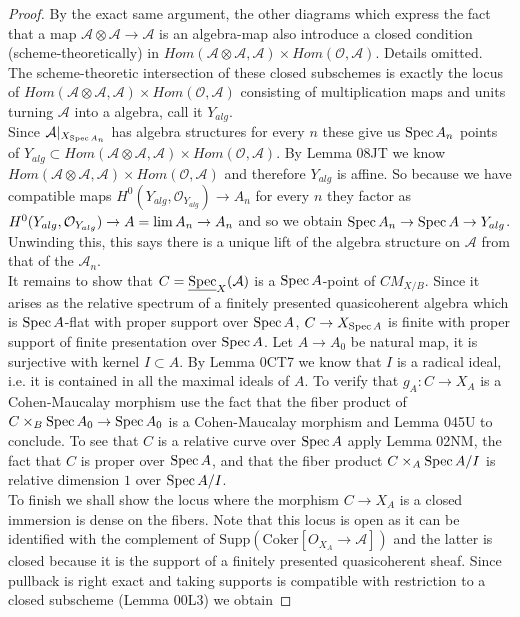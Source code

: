 \documentclass{stacks-project}
\theoremstyle{plain}
\theoremstyle{definition}
\DeclareMathOperator{\Spec}{Spec}
\theoremstyle{remark}
\numberwithin{equation}{subsection}
\def\lim{\mathop{\rm lim}\nolimits}
\def\Spec{\mathop{\rm Spec}}
\begin{document}
\begin{proof}
By the exact same argument, the other diagrams which express the fact that a map $\mathcal{A} \otimes \mathcal{A} \to \mathcal{A}$ is an algebra-map also introduce a closed condition (scheme-theoretically) in $Hom(\mathcal{A} \otimes \mathcal{A}, \mathcal{A}) \times Hom(\mathcal{O},\mathcal{A})$. Details omitted. 
\\

The scheme-theoretic intersection of these closed subschemes is exactly the locus of $Hom(\mathcal{A} \otimes \mathcal{A}, \mathcal{A}) \times Hom(\mathcal{O},\mathcal{A})$ consisting of multiplication maps and units turning $\mathcal{A}$ into a algebra, call it $Y_{alg}$. 
\\

Since $\mathcal{A}|_{X_{\Spec A_n}}$ has algebra structures for every $n$ these give us $\Spec A_n$ points of $Y_{alg} \subset Hom(\mathcal{A} \otimes \mathcal{A}, \mathcal{A}) \times Hom(\mathcal{O},\mathcal{A})$. By Lemma 08JT we know $Hom(\mathcal{A} \otimes \mathcal{A}, \mathcal{A}) \times Hom(\mathcal{O},\mathcal{A})$ and therefore $Y_{alg}$ is affine. So because we have compatible maps $H^0(Y_{alg},\mathcal{O}_{Y_{alg}}) \to A_n$ for every $n$ they factor as $H^0(Y_{alg},\mathcal{O}_{Y_{alg}}) \to A = \lim A_n \to  A_n$ and so we obtain $\Spec A_n \to \Spec A \to Y_{alg}$. Unwinding this, this says there is a unique lift of the algebra structure on $\mathcal{A}$ from that of the $\mathcal{A}_n$. 
\\

It remains to show that $C=\underline{\Spec}_X(\mathcal{A})$ is a $\Spec A$-point of $CM_{X/B}$. Since it arises as the relative spectrum of a finitely presented quasicoherent algebra which is $\Spec A$-flat with proper support over $\Spec A$, $C \to X_{\Spec A}$ is finite with proper support of finite presentation over $\Spec A$. Let $A \to A_0$ be natural map, it is surjective with kernel $I \subset A$. By Lemma 0CT7 we know that $I$ is a radical ideal, i.e. it is contained in all the maximal ideals of $A$. To verify that $g_A: C \to X_A$ is a Cohen-Maucalay morphism use the fact that the fiber product of $C \times_B \Spec A_0 \to \Spec A_0$ is a Cohen-Maucalay morphism and Lemma 045U to conclude. To see that $C$ is a relative curve over $\Spec A$ apply Lemma 02NM, the fact that $C$ is proper over $\Spec A$, and that the fiber product $C \times_A \Spec A/I$ is relative dimension $1$ over $\Spec A/I$. 
\\

To finish we shall show the locus where the morphism $C \to X_A$ is a closed immersion is dense on the fibers. Note that this locus is open as it can be identified with the complement of $\text{Supp}(\text{Coker}[O_{X_A} \to \mathcal{A}])$ and the latter is closed because it is the support of a finitely presented quasicoherent sheaf. Since pullback is right exact and taking supports is compatible with restriction to a closed subscheme (Lemma 00L3) we obtain 


\end{proof}
\end{document}
